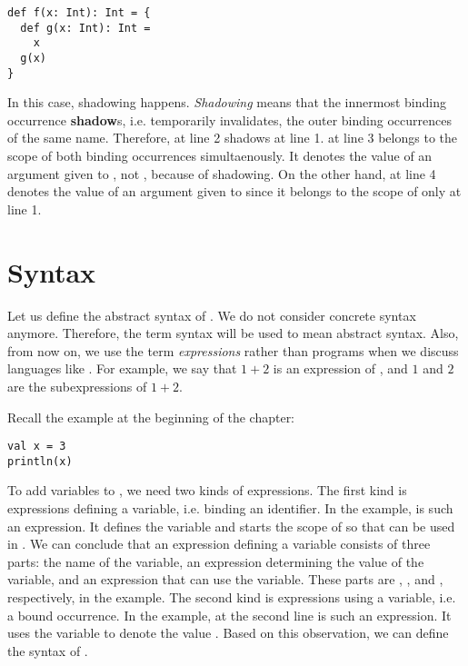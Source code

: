 \begin{verbatim}
def f(x: Int): Int = {
  def g(x: Int): Int =
    x
  g(x)
}
\end{verbatim}

In this case, shadowing happens. \textit{Shadowing} means that
the innermost binding occurrence \textbf{shadow}s, i.e. temporarily invalidates,
the outer binding occurrences of the same name. Therefore,  at line 2
shadows  at line 1.
 at line 3 belongs to the scope of both binding occurrences simultaenously.
It denotes the value of an argument given to , not , because of
shadowing. On the other hand,  at line 4 denotes the value of an
argument given to  since it belongs to the scope of only  at
line 1.

\section{Syntax}

Let us define the abstract syntax of \Lang. We do not consider concrete
syntax anymore. Therefore, the term syntax will be used to mean abstract
syntax. Also, from now on, we use the term
\textit{expressions} rather than
programs when we discuss languages like \Lang. For example, we say that
$1+2$ is an expression of \plang, and $1$ and $2$ are the subexpressions of
$1+2$.

Recall the example at the beginning of the chapter:

\begin{verbatim}
val x = 3
println(x)
\end{verbatim}

To add variables to \plang, we need two kinds of expressions. The first kind is
expressions defining a variable, i.e. binding an identifier. In the example,
 is such an expression. It defines the
variable  and starts the scope of  so that  can be used
in . We can conclude that an expression defining a variable
consists of three parts: the name of the variable, an expression determining the
value of the variable, and an expression that can use the variable. These parts
are , , and , respectively, in the example. The
second kind is expressions using a variable, i.e. a bound occurrence. In the
example,  at the second line is such an expression. It uses the variable  to denote
the value . Based on this observation, we can define the syntax of
\Lang.

